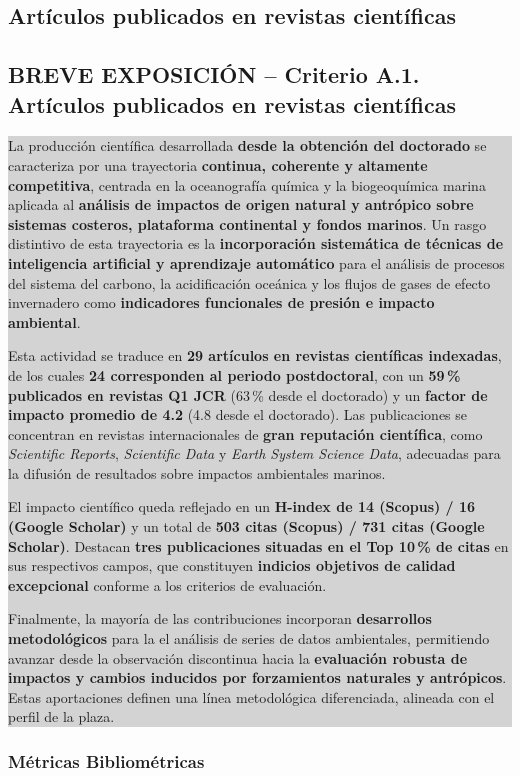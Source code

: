 \documentclass[11pt,a4paper]{article}
\newcommand{\breveexposicion}[2]{
    \subsection*{\color{darkgray}\textbf{BREVE EXPOSICIÓN -- #1}}
    \vspace{0.3em}
    \noindent\colorbox{lightgray}{%
        \begin{minipage}{0.97\textwidth}
        \vspace{0.5em}
        \color{darkgray}
        #2
        \vspace{0.5em}
        \end{minipage}
    }
    \vspace{1em}
}
\begin{document}
\subsection{Artículos publicados en revistas científicas}

\breveexposicion{Criterio A.1. Artículos publicados en revistas científicas}{
La producción científica desarrollada \textbf{desde la obtención del doctorado} se caracteriza por una trayectoria \textbf{continua, coherente y altamente competitiva}, centrada en la oceanografía química y la biogeoquímica marina aplicada al \textbf{análisis de impactos de origen natural y antrópico sobre sistemas costeros, plataforma continental y fondos marinos}. Un rasgo distintivo de esta trayectoria es la \textbf{incorporación sistemática de técnicas de inteligencia artificial y aprendizaje automático} para el análisis de procesos del sistema del carbono, la acidificación oceánica y los flujos de gases de efecto invernadero como \textbf{indicadores funcionales de presión e impacto ambiental}.

Esta actividad se traduce en \textbf{29 artículos en revistas científicas indexadas}, de los cuales \textbf{24 corresponden al periodo postdoctoral}, con un \textbf{59\,\% publicados en revistas Q1 JCR} (63\,\% desde el doctorado) y un \textbf{factor de impacto promedio de 4.2} (4.8 desde el doctorado). Las publicaciones se concentran en revistas internacionales de \textbf{gran reputación científica}, como \textit{Scientific Reports}, \textit{Scientific Data} y \textit{Earth System Science Data}, adecuadas para la difusión de resultados sobre impactos ambientales marinos.

El impacto científico queda reflejado en un \textbf{H-index de 14 (Scopus) / 16 (Google Scholar)} y un total de \textbf{503 citas (Scopus) / 731 citas (Google Scholar)}. Destacan \textbf{tres publicaciones situadas en el Top 10\,\% de citas} en sus respectivos campos, que constituyen \textbf{indicios objetivos de calidad excepcional} conforme a los criterios de evaluación.

Finalmente, la mayoría de las contribuciones incorporan \textbf{desarrollos metodológicos} para la el análisis de series de datos ambientales, permitiendo avanzar desde la observación discontinua hacia la \textbf{evaluación robusta de impactos y cambios inducidos por forzamientos naturales y antrópicos}. Estas aportaciones definen una línea metodológica diferenciada, alineada con el perfil de la plaza.
}

\subsubsection{Métricas Bibliométricas}
\end{document}
